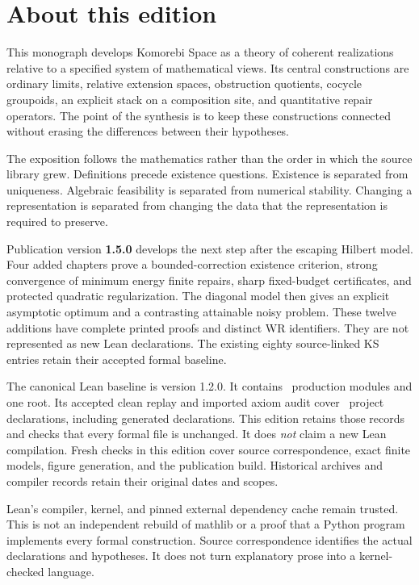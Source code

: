 \documentclass[11pt]{article}
\begin{document}
\KomorebiCover
{}
\section*{About this edition}
This monograph develops Komorebi Space as a theory of coherent realizations relative to a specified system of mathematical views. Its central constructions are ordinary limits, relative extension spaces, obstruction quotients, cocycle groupoids, an explicit stack on a composition site, and quantitative repair operators. The point of the synthesis is to keep these constructions connected without erasing the differences between their hypotheses.

The exposition follows the mathematics rather than the order in which the source library grew. Definitions precede existence questions. Existence is separated from uniqueness. Algebraic feasibility is separated from numerical stability. Changing a representation is separated from changing the data that the representation is required to preserve.

Publication version \textbf{1.5.0} develops the next step after the escaping Hilbert model. Four added chapters prove a bounded-correction existence criterion, strong convergence of minimum energy finite repairs, sharp fixed-budget certificates, and protected quadratic regularization. The diagonal model then gives an explicit asymptotic optimum and a contrasting attainable noisy problem. These twelve additions have complete printed proofs and distinct WR identifiers. They are not represented as new Lean declarations. The existing eighty source-linked KS entries retain their accepted formal baseline.

The canonical Lean baseline is version 1.2.0. It contains \EditionFormalModules\ production modules and one root. Its accepted clean replay and imported axiom audit cover \EditionAuditedDeclarations\ project declarations, including generated declarations. This edition retains those records and checks that every formal file is unchanged. It does \emph{not} claim a new Lean compilation. Fresh checks in this edition cover source correspondence, exact finite models, figure generation, and the publication build. Historical archives and compiler records retain their original dates and scopes.

Lean's compiler, kernel, and pinned external dependency cache remain trusted. This is not an independent rebuild of mathlib or a proof that a Python program implements every formal construction. Source correspondence identifies the actual declarations and hypotheses. It does not turn explanatory prose into a kernel-checked language.
\end{document}
